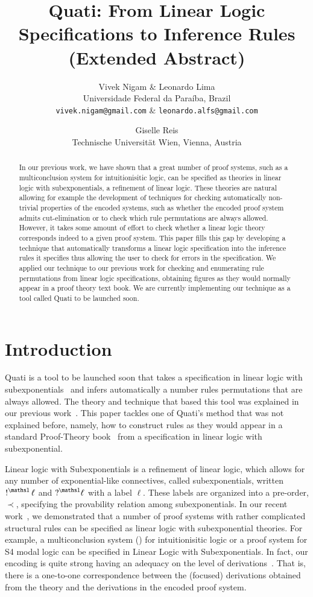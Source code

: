 \documentclass[a4paper,10pt]{article}
\title{Quati: From Linear Logic Specifications to Inference Rules (Extended Abstract)}
\author{Vivek Nigam \& Leonardo Lima \\
Universidade Federal da Paraíba, Brazil\\
\texttt{vivek.nigam@gmail.com} \& \texttt{leonardo.alfs@gmail.com} 
\and Giselle Reis\\
Technische Universit\"at Wien, Vienna, Austria}
\begin{document}
\maketitle

\begin{abstract}
In our previous work, we have shown that a great number of proof systems, such 
as a multiconclusion system for intuitionisitic logic, can 
be specified as theories in linear logic with subexponentials, a refinement of linear logic. 
These theories are natural allowing for example the development of techniques for checking
automatically non-trivial properties of the encoded systems, such as whether the encoded proof system 
admits cut-elimination or to check which rule permutations are always allowed. 
However, it takes some amount of effort to check whether a linear logic theory corresponds
indeed to a given proof system. This paper fills this gap by developing a technique that automatically 
transforms a linear logic specification into the inference rules it specifies thus allowing
the user to check for errors in the specification. We applied our technique to our previous work for 
checking and enumerating rule permutations from linear logic specifications, obtaining figures
as they would normally appear in a proof theory text book. We are currently implementing our technique 
as a tool called Quati to be launched soon.
\end{abstract}

\section{Introduction}
Quati is a tool to be launched soon that takes a specification in linear logic with subexponentials~\cite{nigam09ppdp} 
and infers automatically a number rules permutations that are always allowed. The theory and technique that 
based this tool was explained in our previous work~\cite{nigam13iclp}. This paper tackles one of 
Quati's method that was not explained before, namely, how to construct rules as they would appear in 
a standard Proof-Theory book~\cite{troelstra96bpt} from a specification in linear logic with subexponential.

Linear logic with Subexponentials is a refinement of linear logic, which allows for any number of 
exponential-like connectives, called subexponentials, written $\nbang{\ell}$ and $\nquest{\ell}$ with a label $\ell$. These labels
 are organized into a pre-order, $\prec$, specifying the provability relation among subexponentials.   
In our recent work~\cite{nigam.jlc}, we demonstrated
that a number of proof systems with rather complicated structural rules can be specified as linear logic with subexponential 
theories. For example, a multiconclusion system (\mLJ) for intuitionisitic logic or a proof system for S4 modal logic can be specified in 
Linear Logic with Subexponentials. 
In fact, our encoding is quite strong having an adequacy on the level of 
derivations~\cite{nigam10jar}. That is, there is a one-to-one correspondence between the (focused) derivations
obtained from the theory and the derivations in the encoded proof system. 
\end{document}

